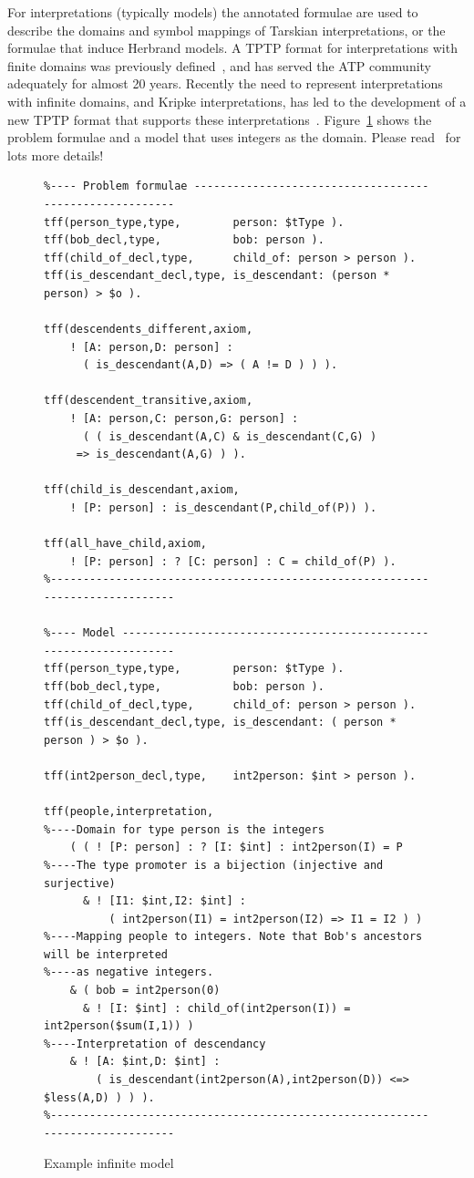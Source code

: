 \documentclass{easychair}
\begin{document}
For interpretations (typically models) the annotated formulae are used to describe the domains
and symbol mappings of Tarskian interpretations, or the formulae that induce Herbrand models.
A TPTP format for interpretations with finite domains was previously defined~\cite{SS+06}, 
and has served the ATP community adequately for almost 20 years. 
Recently the need to represent interpretations with infinite domains, and Kripke interpretations, 
has led to the development of a new TPTP format that supports these interpretations~\cite{SSP24}.
Figure~\ref{ExampleModel} shows the problem formulae and a model that uses integers as the domain.
Please read~\cite{SSP24} for lots more details!

\begin{figure}[htb]
{\footnotesize
{\setlength{\baselineskip}{3mm}
\begin{verbatim}
%---- Problem formulae --------------------------------------------------------
tff(person_type,type,        person: $tType ).
tff(bob_decl,type,           bob: person ).
tff(child_of_decl,type,      child_of: person > person ).
tff(is_descendant_decl,type, is_descendant: (person * person) > $o ).

tff(descendents_different,axiom,
    ! [A: person,D: person] : 
      ( is_descendant(A,D) => ( A != D ) ) ).

tff(descendent_transitive,axiom,
    ! [A: person,C: person,G: person] :
      ( ( is_descendant(A,C) & is_descendant(C,G) ) 
     => is_descendant(A,G) ) ).

tff(child_is_descendant,axiom,
    ! [P: person] : is_descendant(P,child_of(P)) ).

tff(all_have_child,axiom,
    ! [P: person] : ? [C: person] : C = child_of(P) ).
%------------------------------------------------------------------------------

%---- Model -------------------------------------------------------------------
tff(person_type,type,        person: $tType ).
tff(bob_decl,type,           bob: person ).
tff(child_of_decl,type,      child_of: person > person ).
tff(is_descendant_decl,type, is_descendant: ( person * person ) > $o ).

tff(int2person_decl,type,    int2person: $int > person ).

tff(people,interpretation,
%----Domain for type person is the integers
    ( ( ! [P: person] : ? [I: $int] : int2person(I) = P
%----The type promoter is a bijection (injective and surjective)
      & ! [I1: $int,I2: $int] : 
          ( int2person(I1) = int2person(I2) => I1 = I2 ) )
%----Mapping people to integers. Note that Bob's ancestors will be interpreted 
%----as negative integers.
    & ( bob = int2person(0)
      & ! [I: $int] : child_of(int2person(I)) = int2person($sum(I,1)) )
%----Interpretation of descendancy
    & ! [A: $int,D: $int] : 
        ( is_descendant(int2person(A),int2person(D)) <=> $less(A,D) ) ) ).
%------------------------------------------------------------------------------
\end{verbatim}
}}
\caption{Example infinite model}
\label{ExampleModel}
\end{figure}
\end{document}
